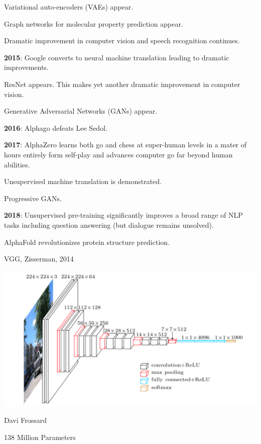 {\vfill
Variational auto-encoders (VAEs) appear.

\vfill
Graph networks for molecular property prediction appear.

\vfill
Dramatic improvement in computer vision and speech recognition continues.


{\bf 2015}: Google converts to neural machine translation leading to dramatic improvements.

\vfill
ResNet appears.  This makes yet another dramatic improvement in computer vision.

\vfill
Generative Adversarial Networks (GANs) appear.

\vfill
{\bf 2016}: Alphago defeats Lee Sedol.


{\bf 2017}: AlphaZero learns both go and chess at super-human levels in a mater of hours entirely form self-play and advances computer go far beyond human abilities.

\vfill
Unsupervised machine translation is demonstrated.

\vfill
Progressive GANs.

\vfill
{\bf 2018}: Unsupervised pre-training significantly improves a broad range of NLP tasks including question answering (but dialogue remains unsolved).

\vfill
AlphaFold revolutionizes protein structure prediction.

{VGG, Zisserman, 2014}

\centerline{\includegraphics[width = 7.0in]{../images/VGG}}
\centerline{\large Davi Frossard}

\vfill
\centerline{{\color{red} 138 Million Parameters}}


}
